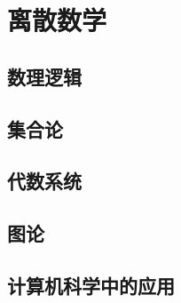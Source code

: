 \part{离散数学}

\chapter{数理逻辑}





\chapter{集合论}




\chapter{代数系统}




\chapter{图论}



\chapter{计算机科学中的应用}


